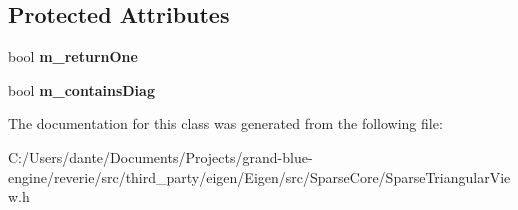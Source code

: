 \subsection*{Protected Attributes}
\begin{DoxyCompactItemize}
\item 
\mbox{\label{class_eigen_1_1internal_1_1unary__evaluator_3_01_triangular_view_3_01_arg_type_00_01_mode_01_4_0e8ca4efc3cb45e07bfa597fdc256f969_aa840daba98da9012d262e1ee1dce1f18}} 
bool {\bfseries m\+\_\+return\+One}
\item 
\mbox{\label{class_eigen_1_1internal_1_1unary__evaluator_3_01_triangular_view_3_01_arg_type_00_01_mode_01_4_0e8ca4efc3cb45e07bfa597fdc256f969_a25e4b1a15ea1a36e9118d4c586d7311c}} 
bool {\bfseries m\+\_\+contains\+Diag}
\end{DoxyCompactItemize}


The documentation for this class was generated from the following file\+:\begin{DoxyCompactItemize}
\item 
C\+:/\+Users/dante/\+Documents/\+Projects/grand-\/blue-\/engine/reverie/src/third\+\_\+party/eigen/\+Eigen/src/\+Sparse\+Core/Sparse\+Triangular\+View.\+h\end{DoxyCompactItemize}
